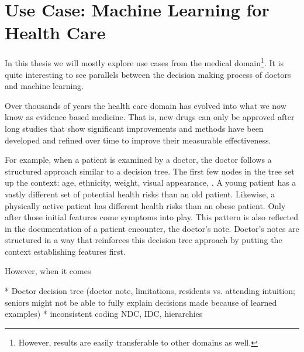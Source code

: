 \section{Use Case: Machine Learning for Health Care}
In this thesis we will mostly explore use cases from the medical domain\footnote{However, results are easily transferable to other domains as well.}.
It is quite interesting to see parallels between the decision making process of doctors and machine learning.

Over thousands of years the health care domain has evolved into what we now know as evidence based medicine.
That is, new drugs can only be approved after long studies that show significant improvements and methods have been developed and refined over time to improve their measurable effectiveness.

For example, when a patient is examined by a doctor, the doctor follows a structured approach similar to a decision tree.
The first few nodes in the tree set up the context: age, ethnicity, weight, visual appearance, \etc.
A young patient has a vastly different set of potential health risks than an old patient.
Likewise, a physically active patient has different health risks than an obese patient.
Only after those initial features come symptoms into play.
This pattern is also reflected in the documentation of a patient encounter, the doctor's note.
Doctor's notes are structured in a way that reinforces this decision tree approach by putting the context establishing features first.

However, when it comes \todo{}

* Doctor decision tree (doctor note, limitations, residents vs. attending intuition; seniors might not be able to fully explain decisions made because of learned examples)
* inconsistent coding NDC, IDC, hierarchies
